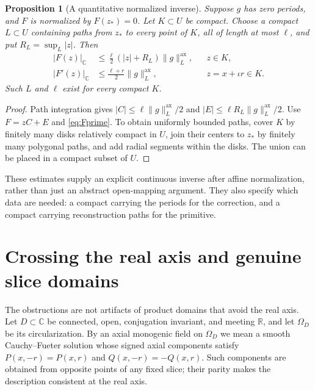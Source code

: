 \documentclass[11pt,a4paper]{article}
\numberwithin{equation}{section}
\newtheorem{proposition}[theorem]{Proposition}
\theoremstyle{definition}
\theoremstyle{remark}
\newcommand{\R}{\mathbb R}
\newcommand{\C}{\mathbb C}
\newcommand{\pairnorm}[1]{\lVert #1\rVert^{\mathrm{ax}}}
\newcommand{\cnorm}[1]{\lvert #1\rvert_{\C}}
\begin{document}
\begin{proposition}[A quantitative normalized inverse]\label{prop:inverse-est}
Suppose $g$ has zero periods, and $F$ is normalized by $F(z_*)=0$.
Let $K\subset U$ be compact. Choose a compact $L\subset U$ containing
paths from $z_*$ to every point of $K$, all of length at most $\ell$,
and put $R_L=\sup_L|z|$. Then
\begin{align}
 \cnorm{F(z)}&\le\frac{\ell}{2}(|z|+R_L)\pairnorm g_L,
                 &&z\in K,\label{eq:inverse-est}\\
 \cnorm{F'(z)}&\le\frac{\ell+r}{2}\pairnorm g_L,
                 &&z=x+\iota r\in K.\label{eq:inverse-der-est}
\end{align}
Such $L$ and $\ell$ exist for every compact $K$.
\end{proposition}
\begin{proof}
Path integration gives $|C|\le\ell\pairnorm g_L/2$ and
$|E|\le\ell R_L\pairnorm g_L/2$. Use $F=zC+E$ and
\eqref{eq:Fprime}. To obtain uniformly bounded paths, cover $K$ by
finitely many disks relatively compact in $U$, join their centers to
$z_*$ by finitely many polygonal paths, and add radial segments within
the disks. The union can be placed in a compact subset of $U$.
\end{proof}

These estimates supply an explicit continuous inverse after affine
normalization, rather than just an abstract open-mapping argument.
They also specify which data are needed: a compact carrying the periods
for the correction, and a compact carrying reconstruction paths for the
primitive.

\section{Crossing the real axis and genuine slice domains}
\label{sec:real}

The obstructions are not artifacts of product domains that avoid the
real axis. Let $D\subset\C$ be connected, open, conjugation invariant,
and meeting $\R$, and let $\Omega_D$ be its circularization. By an axial
monogenic field on $\Omega_D$ we mean a smooth Cauchy--Fueter solution
whose signed axial components satisfy $P(x,-r)=P(x,r)$ and
$Q(x,-r)=-Q(x,r)$. Such components are obtained from opposite points of
any fixed slice; their parity makes the description consistent at the
real axis.
\end{document}
